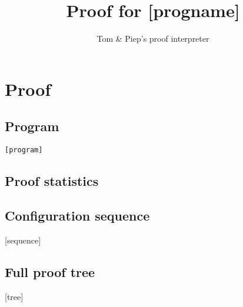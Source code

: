 \documentclass{article}
\begin{document}
\title{Proof for [progname]}
\author{Tom \& Piep's proof interpreter}

\maketitle

\section{Proof}
\subsection{Program}
\begin{lstlisting}
[program]
\end{lstlisting}

\subsection{Proof statistics}

\begin{landscape}
\subsection{Configuration sequence}
[sequence]

\subsection{Full proof tree}
\scriptsize{
[tree]
}
\end{landscape}
\end{document}
